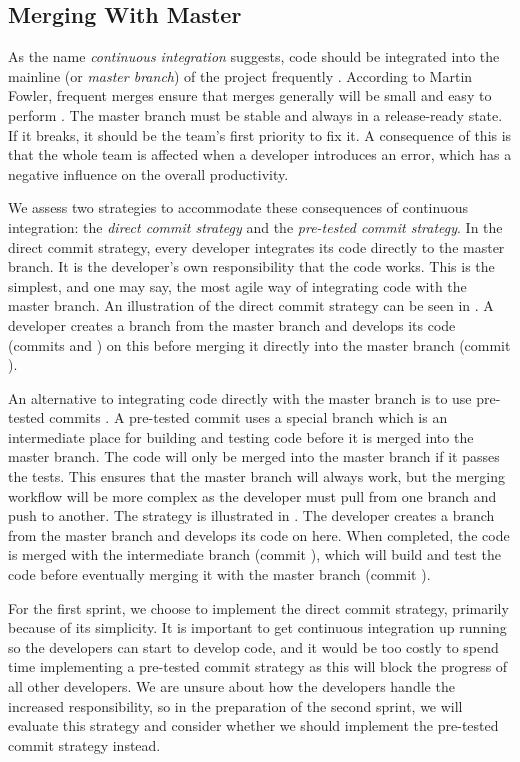 \subsection{Merging With Master}\label{sec:branching_strategy}
As the name \emph{continuous integration} suggests, code should be integrated into the mainline (or \emph{master branch}) of the project frequently \parencite{fowlerCI}. According to Martin Fowler, frequent merges ensure that merges generally will be small and easy to perform \parencite{fowlerFeatureBranch}. The master branch must be stable and always in a release-ready state. If it breaks, it should be the team's first priority to fix it. A consequence of this is that the whole team is affected when a developer introduces an error, which has a negative influence on the overall productivity.

We assess two strategies to accommodate these consequences of continuous integration: the \emph{direct commit strategy} and the \emph{pre-tested commit strategy}. In the direct commit strategy, every developer integrates its code directly to the master branch. It is the developer's own responsibility that the code works. This is the simplest, and one may say, the most agile way of integrating code with the master branch. An illustration of the direct commit strategy can be seen in . A developer creates a branch from the master branch and develops its code (commits  and ) on this before merging it directly into the master branch (commit ).

An alternative to integrating code directly with the master branch is to use pre-tested commits \parencite{fowlerPendingHead}. A pre-tested commit uses a special branch which is an intermediate place for building and testing code before it is merged into the master branch. The code will only be merged into the master branch if it passes the tests. This ensures that the master branch will always work, but the merging workflow will be more complex as the developer must pull from one branch and push to another. The strategy is illustrated in . The developer creates a branch from the master branch and develops its code on here. When completed, the code is merged with the intermediate branch (commit \emph{}), which will build and test the code before eventually merging it with the master branch (commit ).

For the first sprint, we choose to implement the direct commit strategy, primarily because of its simplicity. It is important to get continuous integration up running so the developers can start to develop code, and it would be too costly to spend time implementing a pre-tested commit strategy as this will block the progress of all other developers. We are unsure about how the developers handle the increased responsibility, so in the preparation of the second sprint, we will evaluate this strategy and consider whether we should implement the pre-tested commit strategy instead.

